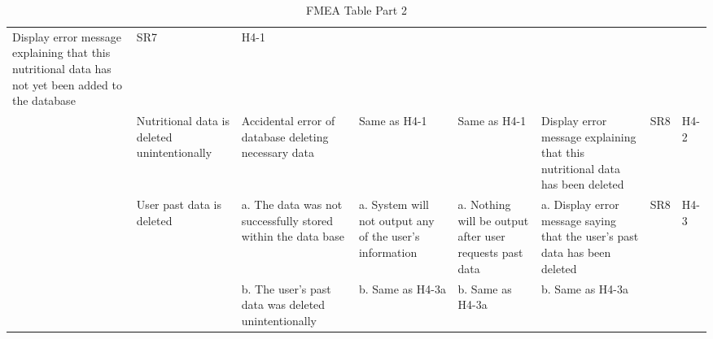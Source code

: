 \documentclass{article}
\begin{document}
\begin{landscape}
\begin{table}[ht]
{\begin{tabular}{|p{2cm}|p{3cm}|p{3cm}|p{3cm}|p{3cm}|p{3cm}|p{1cm}|p{1cm}|}
				Display error message explaining that this nutritional data has 
				not yet been added to the database & SR7 & H4-1 \\ \cline{2-8}
				& Nutritional data is deleted unintentionally & Accidental 
				error of database deleting necessary data & Same as H4-1 & Same 
				as H4-1 & Display error message explaining that this 
				nutritional data has been deleted & SR8 & H4-2\\ \cline{2-8}
				& User past data is deleted & a. The data was not successfully 
				stored within the data base & a. System will not output any of 
				the user's information & a. Nothing will be output after user 
				requests past data & a. Display error message saying that the 
				user's past data has been deleted & SR8 & H4-3\\ 
				& & b. The user's past data was deleted unintentionally & b. Same as H4-3a & b. Same as H4-3a & b. Same as H4-3a & &\\\hline
			\end{tabular}
		}
		
		\caption{FMEA Table Part 2}
		\label{FMEAPart2}
	\end{table}
\end{landscape}
\end{document}
